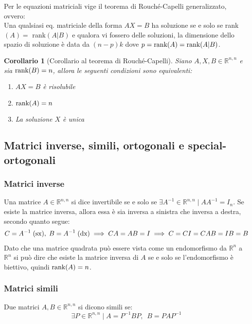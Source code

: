 \documentclass{article}
\newtheorem{corollary}{Corollario}[theorem]
\begin{document}
    \vspace{10pt}
    Per le equazioni matriciali vige il teorema di Rouché-Capelli generalizzato, ovvero: \\
    Una qualsiasi eq. matriciale della forma $AX = B$ ha soluzione se e solo se rank$(A) = $ rank$(A | B)$ e qualora vi fossero delle soluzioni, la dimensione dello 
    spazio di soluzione è data da $(n - p)k$ dove $p = \textnormal{rank}(A) = \textnormal{rank}(A | B)$.

    \vspace{10pt}
    \begin{corollary}[Corollario al teorema di Rouché-Capelli]
        Siano $A, X, B \in \mathbb{R}^{n, n}$ e sia $\textnormal{rank}(B) = n$, allora le seguenti condizioni sono equivalenti:
        \begin{enumerate}[label=(\Roman*)]
            \item $AX = B$ è risolubile
            \item $\textnormal{rank}(A) = n$
            \item La soluzione $X$ è unica 
        \end{enumerate}
    \end{corollary}


\vspace{10pt}
\subsection{Matrici inverse, simili, ortogonali e special-ortogonali} \label{subsec:matspecial}
    \subsubsection{Matrici inverse} \label{subsubsec:matinv}
    Una matrice $A \in \mathbb{R}^{n, n}$ si dice invertibile se e solo se $\exists A^{-1} \in \mathbb{R}^{n, n} \; | \; AA^{-1} = I_n$. Se esiste la matrice inversa, allora essa è sia inversa a sinistra che inversa a destra, secondo quanto segue:
    \[
        C = A^{-1} \; (\textnormal{sx}), \; B = A^{-1} \; (\textnormal{dx}) \implies CA = AB = I \implies C = CI = CAB = IB = B 
    \]
    Dato che una matrice quadrata può essere vista come un endomorfismo da $\mathbb{R}^{n}$ a $\mathbb{R}^{n}$ si può dire che esiste la matrice inversa di $A$ se e solo se l'endomorfismo è biettivo, quindi $\textnormal{rank}(A) = n$.

    \subsubsection{Matrici simili} \label{subsubsec:matalike}
    \vspace{10pt}
    Due matrici $A, B \in \mathbb{R}^{n, n}$ si dicono simili se:
    \[
        \exists P \in \mathbb{R}^{n, n} \; | \; A = P^{-1}BP, \;\: B = PAP^{-1}
    \]
\end{document}
